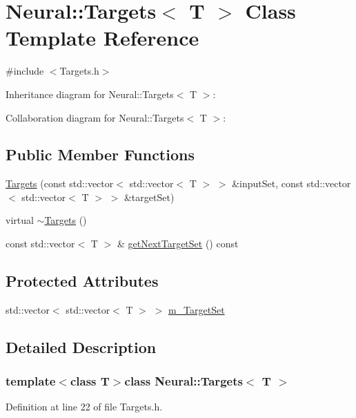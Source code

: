 \hypertarget{class_neural_1_1_targets}{
\section{Neural::Targets$<$ T $>$ Class Template Reference}
\label{class_neural_1_1_targets}
}


{\ttfamily \#include $<$Targets.h$>$}



Inheritance diagram for Neural::Targets$<$ T $>$:


Collaboration diagram for Neural::Targets$<$ T $>$:
\subsection*{Public Member Functions}
\begin{DoxyCompactItemize}
\item 
\hyperlink{class_neural_1_1_targets_a72314af2d03b9f38cd8f09d21a98b2ef}{Targets} (const std::vector$<$ std::vector$<$ T $>$ $>$ \&inputSet, const std::vector$<$ std::vector$<$ T $>$ $>$ \&targetSet)
\item 
virtual \hyperlink{class_neural_1_1_targets_a1765f55076e775924e79cd1776145bb8}{$\sim$Targets} ()
\item 
const std::vector$<$ T $>$ \& \hyperlink{class_neural_1_1_targets_a3cc90a60a137ac75f29e88ce6915214f}{getNextTargetSet} () const 
\end{DoxyCompactItemize}
\subsection*{Protected Attributes}
\begin{DoxyCompactItemize}
\item 
std::vector$<$ std::vector$<$ T $>$ $>$ \hyperlink{class_neural_1_1_targets_a53f802641d432e7d3d4ed3dfb7fbf281}{m\_\-TargetSet}
\end{DoxyCompactItemize}


\subsection{Detailed Description}
\subsubsection*{template$<$class T$>$class Neural::Targets$<$ T $>$}



Definition at line 22 of file Targets.h.



